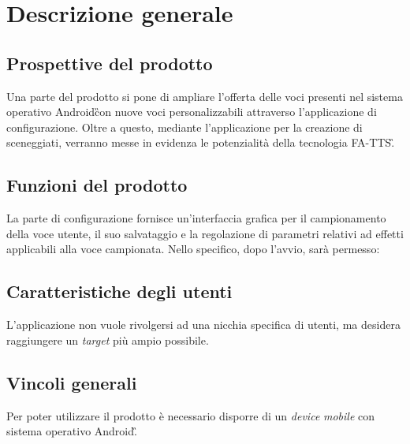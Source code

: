 \section{Descrizione generale}

\subsection{Prospettive del prodotto}
Una parte del prodotto si pone di ampliare l'offerta delle voci presenti nel  sistema operativo Android\G con nuove voci personalizzabili attraverso l'applicazione di configurazione. Oltre a questo, mediante l'applicazione per la creazione di sceneggiati, verranno messe in evidenza le potenzialità della tecnologia FA-TTS\G.

\subsection{Funzioni del prodotto}
La parte di configurazione fornisce un'interfaccia grafica per il campionamento della voce utente, il suo salvataggio e la regolazione di parametri relativi ad effetti applicabili alla voce campionata. Nello specifico, dopo l'avvio, sarà permesso:

\subsection{Caratteristiche degli utenti}
L'applicazione non vuole rivolgersi ad una nicchia specifica di utenti, ma desidera raggiungere un \textit{target} più ampio possibile.

\subsection{Vincoli generali}
Per poter utilizzare il prodotto è necessario disporre di un \textit{device} \textit{mobile} con sistema operativo Android\G.